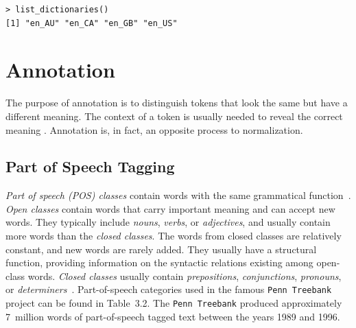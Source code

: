 \begin{verbatim}
> list_dictionaries()
[1] "en_AU" "en_CA" "en_GB" "en_US"
\end{verbatim}

\section{Annotation}

The purpose of annotation is to distinguish tokens that look the same but have a
different meaning. The context of a token is usually needed to reveal the correct
meaning \cite{ref263}. Annotation is, in fact, an opposite process to normalization.

\subsection{Part of Speech Tagging}

\textit{Part of speech (POS) classes} contain words with the same grammatical function~\cite{ref241}. 
\textit{Open classes} contain words that carry important meaning and can accept 
new words. They typically include \textit{nouns}, \textit{verbs}, or \textit{adjectives}, and 
usually contain more words than the \textit{closed classes}. The words from closed 
classes are relatively constant, and new words are rarely added. They usually 
have a structural function, providing information on the syntactic relations 
existing among open-class words. \textit{Closed classes} usually contain 
\textit{prepositions}, \textit{conjunctions}, \textit{pronouns}, or \textit{determiners}~\cite{ref116}. Part-of-speech categories used in the famous \texttt{Penn Treebank} project can be 
found in Table~3.2. The \texttt{Penn Treebank} produced approximately 7~million 
words of part-of-speech tagged text between the years 1989 and 1996.

